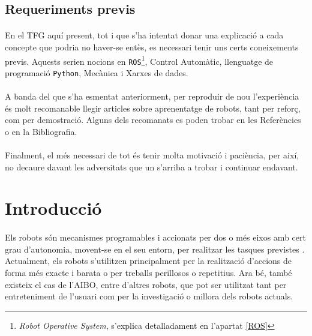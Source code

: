 \documentclass[12pt,a4paper,final,twoside]{article}
\begin{document}
\label{Requeriments}
\subsection*{Requeriments previs}

\paragraph{}En el TFG aquí present, tot i que s'ha intentat donar una explicació a cada concepte que podria no haver-se entès, es necessari tenir uns certs coneixements previs. Aquests serien nocions en \texttt{ROS}\footnote{\textit{Robot Operative System}, s'explica detalladament en l'apartat \ref{ROS}}, Control Automàtic, llenguatge de programació \texttt{Python}, Mecànica i Xarxes de dades.

\paragraph{}A banda del que s'ha esmentat anteriorment, per reproduir de nou l'experiència és molt recomanable llegir articles sobre aprenentatge de robots, tant per reforç, com per demostració. Alguns dels recomanats es poden trobar en les Referències o en la Bibliografia.

\paragraph{}Finalment, el més necessari de tot és tenir molta motivació i paciència, per així, no decaure davant les adversitats que un s'arriba a trobar i continuar endavant.

\newpage
\label{Introduccio}
\section*{Introducció}

\paragraph{}Els robots són mecanismes programables i accionats per dos o més eixos amb cert grau d'autonomia, movent-se en el seu entorn, per realitzar les tasques previstes \cite{ISO_Robot}. Actualment, els robots s'utilitzen principalment per la realització d'accions de forma més exacte i barata o per treballs perillosos o repetitius. Ara bé, també existeix el cas de l'AIBO, entre d'altres robots, que pot ser utilitzat tant per entreteniment de l'usuari com per la investigació o millora dels robots actuals.
\end{document}
